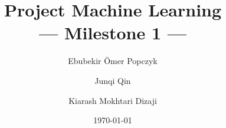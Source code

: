 \documentclass[10pt,a4paper,oneside]{article}
\title{Project Machine Learning\\--- Milestone 1 ---}
\author{Ebubekir Ömer Popczyk \and Junqi Qin \and Kiarash Mokhtari Dizaji}
\date{\today}
\begin{document}
\maketitle


\nocite{*}


\newpage
\end{document}
